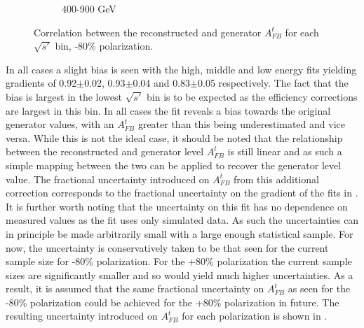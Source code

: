 \begin{figure}
\begin{subfigure}{.6\textwidth}
    \caption{400-900 GeV}
  \end{subfigure}
  \caption{Correlation between the reconstructed and generator $A_{FB}^t$ for each $\sqrt{s'}$ bin, -80\% polarization.}
  \label{fig:biassys}
\end{figure}

In all cases a slight bias is seen with the high, middle and low energy fits yielding gradients of 0.92$\pm$0.02, 0.93$\pm$0.04 and 0.83$\pm$0.05 respectively. The fact that the bias is largest in the lowest $\sqrt{s'}$ bin is to be expected as the efficiency corrections are largest in this bin. In all cases the fit reveals a bias towards the original generator values, with an $A_{FB}^t$ greater than this being underestimated and vice versa. While this is not the ideal case, it should be noted that the relationship between the reconstructed and generator level $A_{FB}^t$ is still linear and as such a simple mapping between the two can be applied to recover the generator level value. The fractional uncertainty introduced on $A_{FB}^t$ from this additional correction corresponds to the fractional uncertainty on the gradient of the fits in . It is further worth noting that the uncertainty on this fit has no dependence on measured values as the fit uses only simulated data. As such the uncertainties can in principle be made arbitrarily small with a large enough statistical sample. For now, the uncertainty is conservatively taken to be that seen for the current sample size for -80\% polarization. For the +80\% polarization the current sample sizes are significantly smaller and so would yield much higher uncertainties. As a result, it is assumed that the same fractional uncertainty on $A_{FB}^t$ as seen for the -80\% polarization could be achieved for the +80\% polarization in future. The resulting uncertainty introduced on $A_{FB}^t$ for each polarization is shown in .

